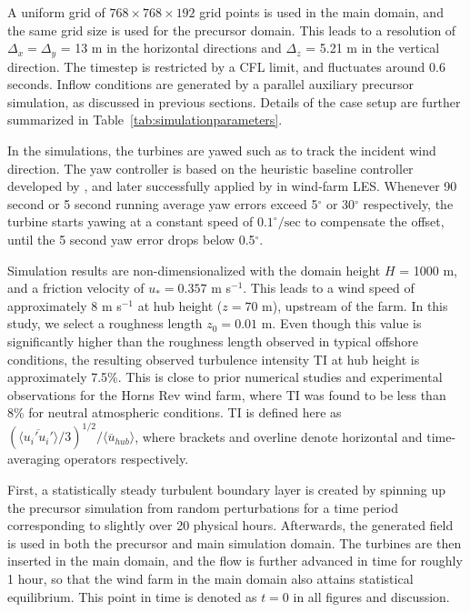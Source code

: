 		A uniform grid of $768 \times 768 \times 192$ grid points is used in the main domain, and the same grid size is used for the precursor domain. This leads to a resolution of $\Delta_x = \Delta_y$ = 13 m in the horizontal directions and $\Delta_z$ = 5.21 m in the vertical direction. The timestep is restricted by a CFL limit, and fluctuates around 0.6 seconds. Inflow conditions are generated by a parallel auxiliary precursor simulation, as discussed in previous sections. Details of the case setup are further summarized in Table~\ref{tab:simulationparameters}.
		
		In the simulations, the turbines are yawed such as to track the incident wind direction. The yaw controller is based on the heuristic baseline controller developed by \cite{kooijman2003dowec}, and later successfully applied by \cite{storey2014modelling} in wind-farm LES. Whenever 90 second or 5 second running average yaw errors exceed 5$^\circ$ or 30$^\circ$ respectively, the turbine starts yawing at a constant speed of $0.1^\circ/\text{sec}$ to compensate the offset, until the 5 second yaw error drops below 0.5$^\circ$.
		
		Simulation results are non-dimensionalized with the domain height $H$ = 1000 m, and a friction velocity of $u_* = 0.357$ m s$^{-1}$. This leads to a wind speed of approximately 8 m s$^{-1}$ at hub height ($z = 70$ m), upstream of the farm. In this study, we select a roughness length $z_0 = 0.01$ m. Even though this value is significantly higher than the roughness length observed in typical offshore conditions, the resulting observed turbulence intensity TI at hub height is approximately 7.5\%. This is close to prior numerical studies \citep{porte2013numerical, wu2015modeling} and experimental observations \citep{barthelmie2009modelling, barthelmie2010quantifying} for the Horns Rev wind farm, where TI was found to be less than 8\% for neutral atmospheric conditions. TI is defined here as $(\langle \overline{ u_i' u_i'} \rangle /3)^{1/2} / \langle \overline{u}_{hub} \rangle$, where brackets and overline denote horizontal and time-averaging operators respectively.
		
		First, a statistically steady turbulent boundary layer is created by spinning up the precursor simulation from random perturbations for a time period corresponding to slightly over 20 physical hours. Afterwards, the generated field is used in both the precursor and main simulation domain. The turbines are then inserted in the main domain, and the flow is further advanced in time for roughly 1 hour, so that the wind farm in the main domain also attains statistical equilibrium. This point in time is denoted as  $t = 0$ in all figures and discussion.
		
